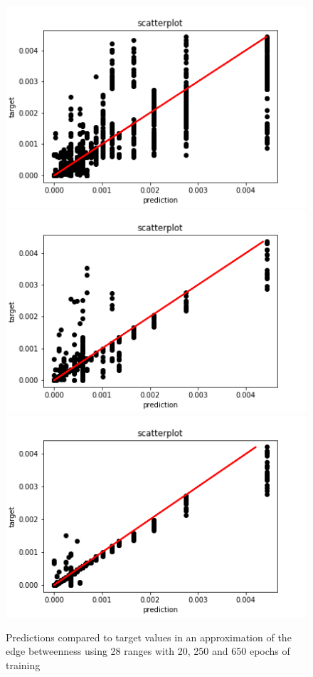 \begin{figure}[H]
%
  \centering
    \includegraphics[width=0.9\linewidth]{img/GN_exp1/28bins/scatter_plot_20epochs.png}
\endminipage
{}%
  \centering
    \includegraphics[width=0.9\linewidth]{img/GN_exp1/28bins/scatter_plot_250epochs.png}
\endminipage
{}%
  \centering
    \includegraphics[width=0.9\linewidth]{img/GN_exp1/28bins/scatter_plot_600epochs.png}
\endminipage
\caption{Predictions compared to target values in an approximation of the edge betweenness using 28 ranges with 20, 250 and 650 epochs of training}\label{fig:edgeb_exp1_20bins}
\end{figure}





